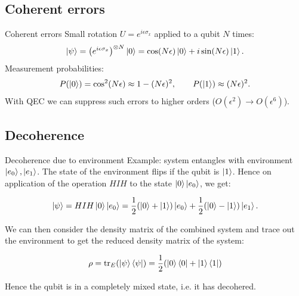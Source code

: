 \documentclass[10pt]{beamer}
\begin{document}
\subsection{Coherent errors}
\begin{frame}{Coherent errors}
  Small rotation \(U = e^{i\epsilon \sigma_x}\) applied to a qubit \(N\) times:
  \[
    \ket{\psi} = \bigl(e^{i\epsilon \sigma_x}\bigr)^{\otimes N}\ket{0}
           = \cos(N\epsilon)\ket{0} + i\sin(N\epsilon)\ket{1}.
  \]
  Measurement probabilities:
  \[
    P(\ket{0})=\cos^2(N\epsilon)\approx 1-(N\epsilon)^2,\qquad 
    P(\ket{1})\approx (N\epsilon)^2.
  \]
  With QEC we can suppress such errors to higher orders ($O(\epsilon^2) \to O(\epsilon^6)$).
\end{frame}

\subsection{Decoherence}
\begin{frame}{Decoherence due to environment}
  Example: system entangles with environment \(\ket{e_0},\ket{e_1}\). The state of the environment flips if the qubit is \(\ket{1}\). Hence on application of the operation \(HIH\) to the state \(\ket{0} \ket{e_0}\), we get:

  \begin{equation*}
    \ket{\psi} = HIH \ket{0} \ket{e_0} = \frac{1}{2}(\ket{0}+\ket{1})\ket{e_0} + \frac{1}{2}(\ket{0}-\ket{1})\ket{e_1}.
  \end{equation*}

  We can then consider the density matrix of the combined system and trace out the environment to get the reduced density matrix of the system:

    \begin{equation*}
        \rho = \tr_E(\ket{\psi}\bra{\psi}) = \frac{1}{2} (
            \ket{0}\bra{0} + \ket{1}\bra{1}
        )
    \end{equation*}

    Hence the qubit is in a completely mixed state, i.e. it has decohered.
\end{frame}
\end{document}
